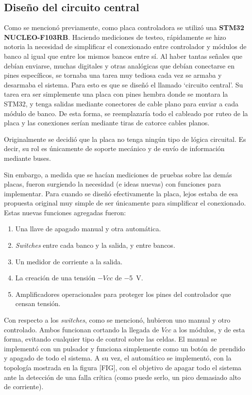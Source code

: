 \subsection{Diseño del circuito central}

Como se mencionó previamente, como placa controladora se utilizó una \textbf{STM32 NUCLEO-F103RB}. Haciendo mediciones de testeo, rápidamente se hizo notoria la necesidad de simplificar el conexionado entre controlador y módulos de banco al igual que entre los mismos bancos entre sí. Al haber tantas señales que debían enviarse, muchas digitales y otras analógicas que debían conectarse en pines específicos, se tornaba una tarea muy tediosa cada vez se armaba y desarmaba el sistema. Para esto es que se diseñó el llamado \enquote*{circuito central}. Su tarea era ser simplemente una placa con pines hembra donde se montara la STM32, y tenga salidas mediante conectores de cable plano para enviar a cada módulo de banco. De esta forma, se reemplazaría todo el cableado por ruteo de la placa y las conexiones serían mediante tiras de catorce cables planos.

Originalmente se decidió que la placa no tenga ningún tipo de lógica circuital. Es decir, su rol es únicamente de soporte mecánico y de envío de información mediante buses.

Sin embargo, a medida que se hacían mediciones de pruebas sobre las demás placas, fueron surgiendo la necesidad (e ideas nuevas) con funciones para implementar. Para cuando se diseñó efectivamente la placa, lejos estaba de esa propuesta original muy simple de ser únicamente para simplificar el conexionado. Estas nuevas funciones agregadas fueron:
\begin{enumerate}
    \item Una llave de apagado manual y otra automática.
    \item \textit{Switches} entre cada banco y la salida, y entre bancos.
    \item Un medidor de corriente a la salida.
    \item La creación de una tensión $-Vcc$ de \SI{-5}{\volt}.
    \item Amplificadores operacionales para proteger los pines del controlador que censan tensión.
\end{enumerate}

Con respecto a los \textit{switches}, como se mencionó, hubieron uno manual y otro controlado. Ambos funcionan cortando la llegada de $Vcc$ a los módulos, y de esta forma, evitando cualquier tipo de control sobre las celdas. El manual se implementó con un pulsador y funciona simplemente como un botón de prendido y apagado de todo el sistema. A su vez, el automático se implementó, con la topología mostrada en la figura [FIG], con el objetivo de apagar todo el sistema ante la detección de una falla crítica (como puede serlo, un pico demasiado alto de corriente).

